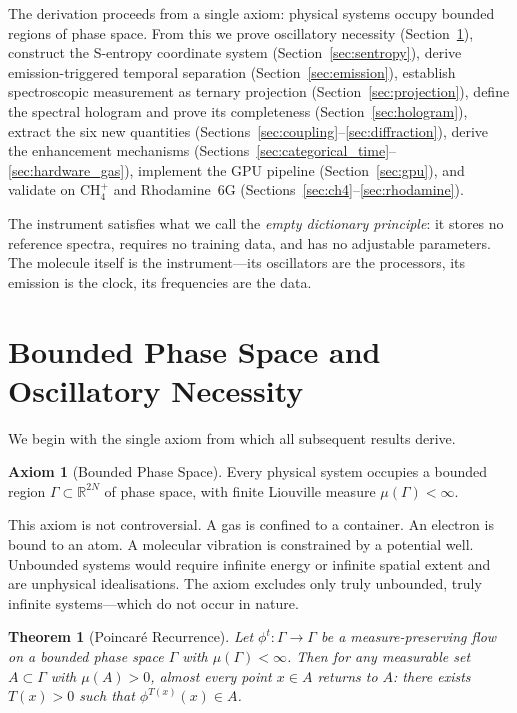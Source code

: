 \documentclass[11pt,a4paper]{article}
\newtheorem{theorem}{Theorem}[section]
\theoremstyle{definition}
\newtheorem{axiom}{Axiom}
\theoremstyle{remark}
\begin{document}
The derivation proceeds from a single axiom: physical systems occupy bounded regions of phase space. From this we prove oscillatory necessity (Section~\ref{sec:bounded}), construct the S-entropy coordinate system (Section~\ref{sec:sentropy}), derive emission-triggered temporal separation (Section~\ref{sec:emission}), establish spectroscopic measurement as ternary projection (Section~\ref{sec:projection}), define the spectral hologram and prove its completeness (Section~\ref{sec:hologram}), extract the six new quantities (Sections~\ref{sec:coupling}--\ref{sec:diffraction}), derive the enhancement mechanisms (Sections~\ref{sec:categorical_time}--\ref{sec:hardware_gas}), implement the GPU pipeline (Section~\ref{sec:gpu}), and validate on CH$_4^+$ and Rhodamine~6G (Sections~\ref{sec:ch4}--\ref{sec:rhodamine}).

The instrument satisfies what we call the \emph{empty dictionary principle}: it stores no reference spectra, requires no training data, and has no adjustable parameters. The molecule itself is the instrument---its oscillators are the processors, its emission is the clock, its frequencies are the data.

\section{Bounded Phase Space and Oscillatory Necessity}
\label{sec:bounded}

We begin with the single axiom from which all subsequent results derive.

\begin{axiom}[Bounded Phase Space]
\label{ax:bounded}
Every physical system occupies a bounded region $\Gamma \subset \mathbb{R}^{2N}$ of phase space, with finite Liouville measure $\mu(\Gamma) < \infty$.
\end{axiom}

This axiom is not controversial. A gas is confined to a container. An electron is bound to an atom. A molecular vibration is constrained by a potential well. Unbounded systems would require infinite energy or infinite spatial extent and are unphysical idealisations. The axiom excludes only truly unbounded, truly infinite systems---which do not occur in nature.

\begin{theorem}[Poincar{\'e} Recurrence]
\label{thm:poincare}
Let $\phi^t : \Gamma \to \Gamma$ be a measure-preserving flow on a bounded phase space $\Gamma$ with $\mu(\Gamma) < \infty$. Then for any measurable set $A \subset \Gamma$ with $\mu(A) > 0$, almost every point $x \in A$ returns to $A$: there exists $T(x) > 0$ such that $\phi^{T(x)}(x) \in A$.
\end{theorem}
\end{document}
